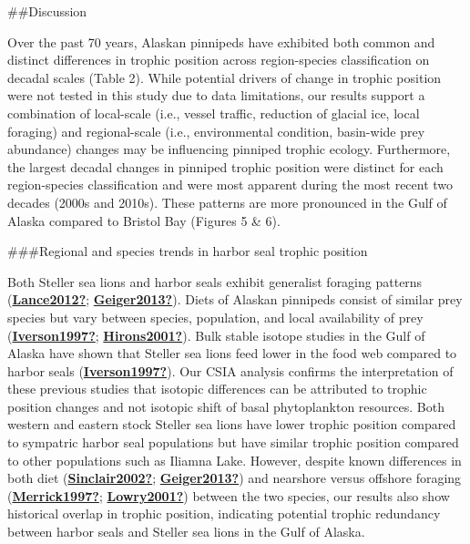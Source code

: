 \documentclass [11pt, proquest] {uwthesis}[2015/03/03]
\begin{document}
\#\#Discussion

Over the past 70 years, Alaskan pinnipeds have exhibited both common and distinct differences in trophic position across region-species classification on decadal scales (Table 2). While potential drivers of change in trophic position were not tested in this study due to data limitations, our results support a combination of local-scale (i.e., vessel traffic, reduction of glacial ice, local foraging) and regional-scale (i.e., environmental condition, basin-wide prey abundance) changes may be influencing pinniped trophic ecology. Furthermore, the largest decadal changes in pinniped trophic position were distinct for each region-species classification and were most apparent during the most recent two decades (2000s and 2010s). These patterns are more pronounced in the Gulf of Alaska compared to Bristol Bay (Figures 5 \& 6).

\#\#\#Regional and species trends in harbor seal trophic position

Both Steller sea lions and harbor seals exhibit generalist foraging patterns (\protect\hyperlink{ref-Lance2012}{\textbf{Lance2012?}}; \protect\hyperlink{ref-Geiger2013}{\textbf{Geiger2013?}}). Diets of Alaskan pinnipeds consist of similar prey species but vary between species, population, and local availability of prey (\protect\hyperlink{ref-Iverson1997}{\textbf{Iverson1997?}}; \protect\hyperlink{ref-Hirons2001}{\textbf{Hirons2001?}}). Bulk stable isotope studies in the Gulf of Alaska have shown that Steller sea lions feed lower in the food web compared to harbor seals (\protect\hyperlink{ref-Iverson1997}{\textbf{Iverson1997?}}). Our CSIA analysis confirms the interpretation of these previous studies that isotopic differences can be attributed to trophic position changes and not isotopic shift of basal phytoplankton resources. Both western and eastern stock Steller sea lions have lower trophic position compared to sympatric harbor seal populations but have similar trophic position compared to other populations such as Iliamna Lake. However, despite known differences in both diet (\protect\hyperlink{ref-Sinclair2002}{\textbf{Sinclair2002?}}; \protect\hyperlink{ref-Geiger2013}{\textbf{Geiger2013?}}) and nearshore versus offshore foraging (\protect\hyperlink{ref-Merrick1997}{\textbf{Merrick1997?}}; \protect\hyperlink{ref-Lowry2001}{\textbf{Lowry2001?}}) between the two species, our results also show historical overlap in trophic position, indicating potential trophic redundancy between harbor seals and Steller sea lions in the Gulf of Alaska.
\end{document}
